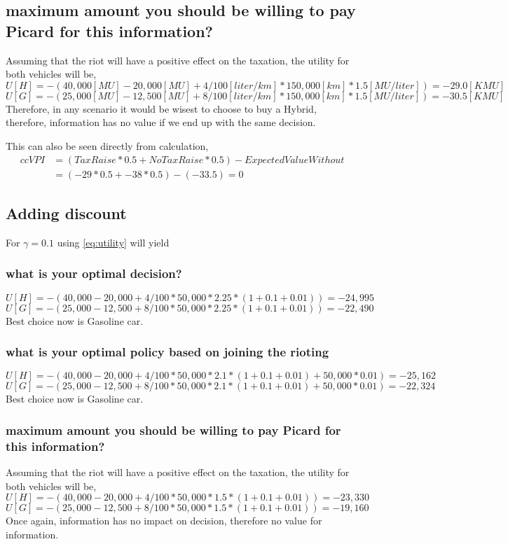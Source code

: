 \documentclass{article}                     %
\begin{document}
	\subsection{maximum amount you should be willing to pay Picard for this information?}
	Assuming that the riot will have a positive effect on the taxation, the utility for both vehicles will be,
	$$ U[H] = -(40,000 [MU] - 20,000[MU] + 4/100[liter/km] * 150,000[km] * 1.5[MU/liter]) = -29.0[KMU] $$
	$$ U[G] = -(25,000 [MU] - 12,500[MU] + 8/100[liter/km] * 150,000[km] * 1.5[MU/liter]) = -30.5[KMU] $$	
	Therefore, in any scenario it would be wisest to choose to buy a Hybrid, therefore, information has no value if we end up with the same decision. 

	This can also be seen directly from calculation,
	\begin{equation}\label{key}
	\begin{split}{cc}
	VPI & = (TaxRaise * 0.5 + NoTaxRaise * 0.5) - ExpectedValueWithout\\ & = (-29*0.5 + -38 * 0.5) - (-33.5)=0
	\end{split}
	\end{equation}
	
	\subsection{Adding discount}
	For $ \gamma = 0.1 $ using \eqref{eq:utility} will yield
	\subsubsection{what is your optimal decision?}
	$$ U[H] = -(40,000 - 20,000 + 4/100 * 50,000 * 2.25 * (1 + 0.1 + 0.01)) = −24,995$$
	$$ U[G] = -(25,000 - 12,500 + 8/100 * 50,000 * 2.25 * (1 + 0.1 + 0.01)) = −22,490$$
	Best choice now is Gasoline car.
	\subsubsection{what is your optimal policy based on joining the rioting}
	$$ U[H] = -(40,000 - 20,000 + 4/100 * 50,000 * 2.1 * (1 + 0.1 + 0.01)+ 50,000 * 0.01) = −25,162$$
	$$ U[G] = -(25,000 - 12,500 + 8/100 * 50,000 * 2.1 * (1 + 0.1 + 0.01)+ 50,000 * 0.01) = −22,324$$	
	Best choice now is Gasoline car.	
	\subsubsection{maximum amount you should be willing to pay Picard for this information?}
	Assuming that the riot will have a positive effect on the taxation, the utility for both vehicles will be,
	$$ U[H] = -(40,000 - 20,000 + 4/100 * 50,000 * 1.5 * (1 + 0.1 + 0.01)) = −23,330$$
	$$ U[G] = -(25,000 - 12,500 + 8/100 * 50,000 * 1.5 * (1 + 0.1 + 0.01)) = −19,160$$		
	Once again, information has no impact on decision, therefore no value for information.
	
\end{document}
